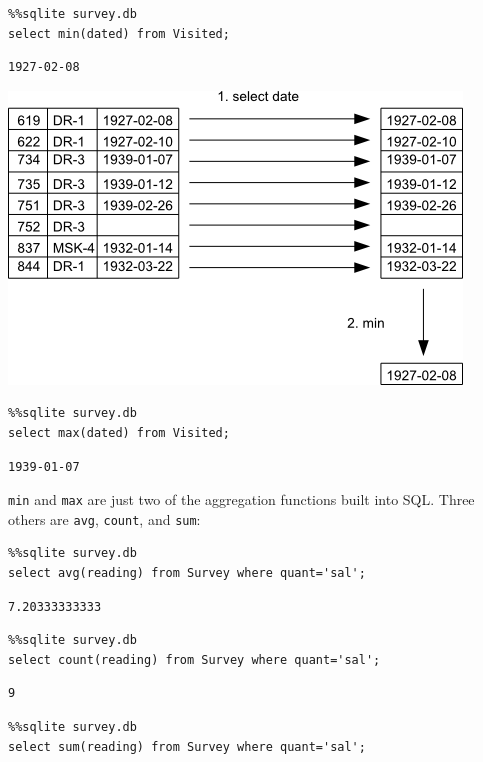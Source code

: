 \documentclass{book}
\begin{document}
\begin{verbatim}
%%sqlite survey.db
select min(dated) from Visited;
\end{verbatim}

\begin{verbatim}
1927-02-08
\end{verbatim}

\includegraphics{novice/sql/img/sql-aggregation.png}

\begin{verbatim}
%%sqlite survey.db
select max(dated) from Visited;
\end{verbatim}

\begin{verbatim}
1939-01-07
\end{verbatim}

\texttt{min} and \texttt{max} are just two of the aggregation functions
built into SQL. Three others are \texttt{avg}, \texttt{count}, and
\texttt{sum}:

\begin{verbatim}
%%sqlite survey.db
select avg(reading) from Survey where quant='sal';
\end{verbatim}

\begin{verbatim}
7.20333333333
\end{verbatim}

\begin{verbatim}
%%sqlite survey.db
select count(reading) from Survey where quant='sal';
\end{verbatim}

\begin{verbatim}
9
\end{verbatim}

\begin{verbatim}
%%sqlite survey.db
select sum(reading) from Survey where quant='sal';
\end{verbatim}
\end{document}
